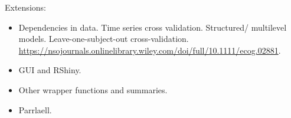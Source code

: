 Extensions:
\begin{itemize}
    \item Dependencies in data. Time series cross validation. Structured/ multilevel models. Leave-one-subject-out cross-validation. \url{https://nsojournals.onlinelibrary.wiley.com/doi/full/10.1111/ecog.02881}.
    \item GUI and RShiny.
    \item Other wrapper functions and summaries.
    \item Parrlaell.
\end{itemize}